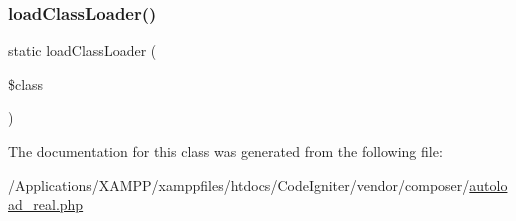 \subsubsection{\texorpdfstring{load\+Class\+Loader()}{loadClassLoader()}}
{\footnotesize\ttfamily static load\+Class\+Loader (\begin{DoxyParamCaption}\item[{}]{\$class }\end{DoxyParamCaption})\hspace{0.3cm}{\ttfamily [static]}}



The documentation for this class was generated from the following file\+:\begin{DoxyCompactItemize}
\item 
/\+Applications/\+X\+A\+M\+P\+P/xamppfiles/htdocs/\+Code\+Igniter/vendor/composer/\mbox{\hyperlink{autoload__real_8php}{autoload\+\_\+real.\+php}}\end{DoxyCompactItemize}
